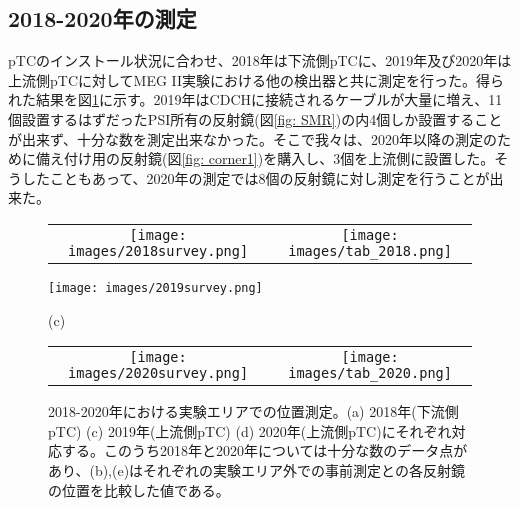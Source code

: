 \documentclass[Yonemoto_master.tex]{subfiles}
\begin{document}
\subsection{2018-2020年の測定}
pTCのインストール状況に合わせ、2018年は下流側pTCに、2019年及び2020年は上流側pTCに対してMEG II実験における他の検出器と共に測定を行った。得られた結果を図\ref{fig: area_survey}に示す。2019年はCDCHに接続されるケーブルが大量に増え、11個設置するはずだったPSI所有の反射鏡(図\ref{fig: SMR})の内4個しか設置することが出来ず、十分な数を測定出来なかった。そこで我々は、2020年以降の測定のために備え付け用の反射鏡(図\ref{fig: corner1})を購入し、3個を上流側に設置した。そうしたこともあって、2020年の測定では8個の反射鏡に対し測定を行うことが出来た。

\begin{figure}[h]
    \begin{tabular}{cc}
      \begin{minipage}[t]{0.45\hsize}
        \centering
        \texttt{[image: images/2018survey.png]}
        \caption*{(a)}
      \end{minipage} &
      \begin{minipage}[t]{0.45\hsize}
        \centering
        \texttt{[image: images/tab\_2018.png]}
        \caption*{(b)}
      \end{minipage}
    \end{tabular}
\begin{center}
\texttt{[image: images/2019survey.png]}
\caption*{(c)}
\end{center}
    \begin{tabular}{cc}
      \begin{minipage}[t]{0.45\hsize}
        \centering
        \texttt{[image: images/2020survey.png]}
        \caption*{(d)}
      \end{minipage} &
      \begin{minipage}[t]{0.45\hsize}
        \centering
        \texttt{[image: images/tab\_2020.png]}
        \caption*{(e)}
      \end{minipage}
    \end{tabular}
    \caption{2018-2020年における実験エリアでの位置測定。(a) 2018年(下流側pTC) (c) 2019年(上流側pTC) (d) 2020年(上流側pTC)にそれぞれ対応する。このうち2018年と2020年については十分な数のデータ点があり、(b),(e)はそれぞれの実験エリア外での事前測定との各反射鏡の位置を比較した値である。}
    \label{fig: area_survey}
\end{figure}
\end{document}
